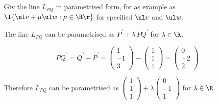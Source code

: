 \documentclass[a4paper]{article}
\begin{document}
\subsection{~} %

\begin{questionbody}
Giv the line $L_{PQ}$ in parametrised form, for as example as $\l\{ \ul v + \mu \ul w : \mu \in \R \r\}$ for specified $\ul v$ and $\ul w$.
\end{questionbody}

The line $L_{PQ}$ can be parametrised as $\overrightarrow{P\;} + \lambda\, \overrightarrow{PQ\;}$ for $\lambda \in \R$.

\[
\overrightarrow{PQ\;}
= \overrightarrow{Q\;} - \overrightarrow{P\;}
= \begin{pmatrix}1 \\ -1 \\ 3\end{pmatrix}
- \begin{pmatrix}1 \\ 1 \\ 1\end{pmatrix}
= \begin{pmatrix}0 \\ -2 \\ 2\end{pmatrix}
\]

Therefore $L_{PQ}$ can be parametrised as $\begin{pmatrix}1 \\ 1 \\ 1\end{pmatrix} + \lambda \begin{pmatrix}0 \\ -1 \\ 1\end{pmatrix}$ for $\lambda \in \R$.
\end{document}
